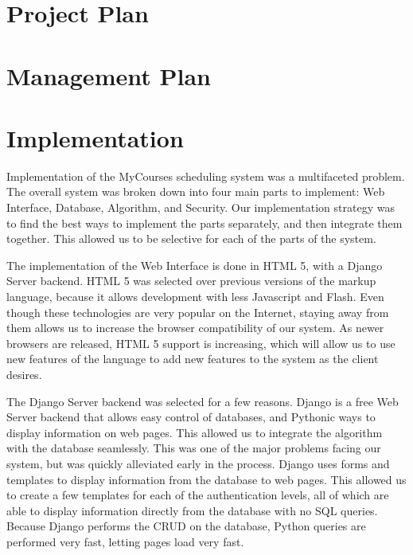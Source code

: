 \documentclass[12pt,article]{memoir}
\begin{document}
\chapter{Project Plan} %
\chapter{Management Plan} %
\chapter{Implementation} %

Implementation of the MyCourses scheduling system was a multifaceted problem. The overall system was broken down into four main parts to implement: Web Interface, Database, Algorithm, and Security. Our implementation strategy was to find the best ways to implement the parts separately, and then integrate them together. This allowed us to be selective for each of the parts of the system.

The implementation of the Web Interface is done in HTML 5, with a Django Server backend. HTML 5 was selected over previous versions of the markup language, because it allows development with less Javascript and Flash. Even though these technologies are very popular on the Internet, staying away from them allows us to increase the browser compatibility of our system. As newer browsers are released, HTML 5 support is increasing, which will allow us to use new features of the language to add new features to the system as the client desires. 

The Django Server backend was selected for a few reasons. Django is a free Web Server backend that allows easy control of databases, and Pythonic ways to display information on web pages. This allowed us to integrate the algorithm with the database seamlessly. This was one of the major problems facing our system, but was quickly alleviated early in the process. Django uses forms and templates to display information from the database to web pages. This allowed us to create a few templates for each of the authentication levels, all of which are able to display information directly from the database with no SQL queries. Because Django performs the CRUD on the database, Python queries are performed very fast, letting pages load very fast.
\end{document}

